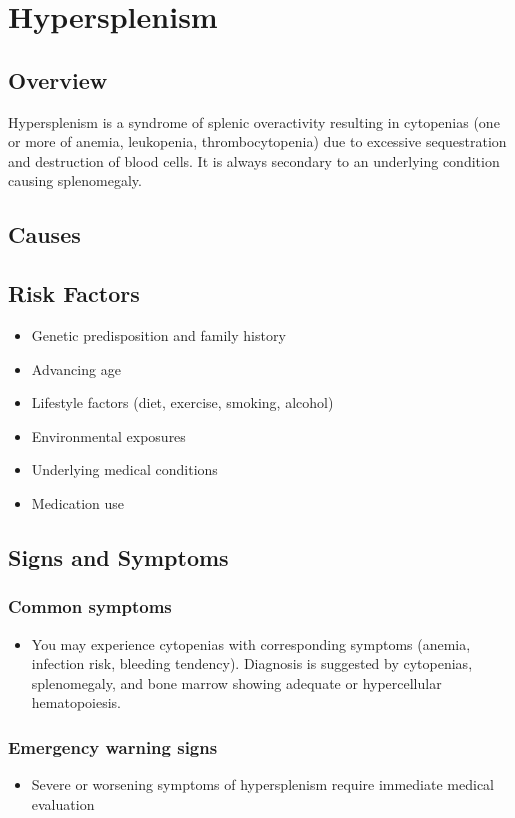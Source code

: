 \chapter{Hypersplenism}
\label{sec:Hypersplenism}

\section{Overview}
Hypersplenism is a syndrome of splenic overactivity resulting in cytopenias (one or more of anemia, leukopenia, thrombocytopenia) due to excessive sequestration and destruction of blood cells. It is always secondary to an underlying condition causing splenomegaly.
\section{Causes}
\section{Risk Factors}

\begin{itemize}[noitemsep]
  \item Genetic predisposition and family history
  \item Advancing age
  \item Lifestyle factors (diet, exercise, smoking, alcohol)
  \item Environmental exposures
  \item Underlying medical conditions
  \item Medication use
\end{itemize}
\section{Signs and Symptoms}

\subsection{Common symptoms}
\begin{itemize}[noitemsep]
  \item You may experience cytopenias with corresponding symptoms (anemia, infection risk, bleeding tendency). Diagnosis is suggested by cytopenias, splenomegaly, and bone marrow showing adequate or hypercellular hematopoiesis. 
  \end{itemize}

\subsection{Emergency warning signs}
\begin{itemize}[noitemsep]
  \item Severe or worsening symptoms of hypersplenism require immediate medical evaluation
\end{itemize}
